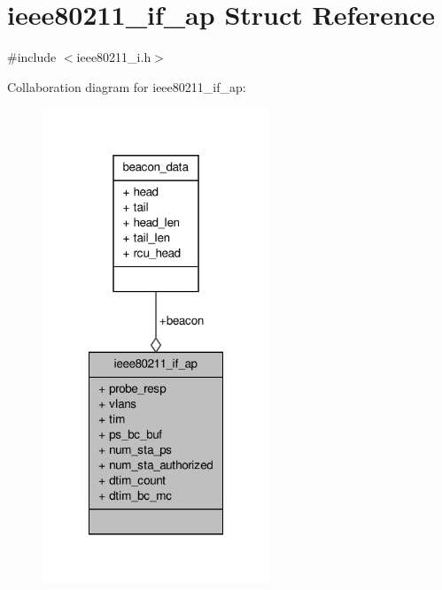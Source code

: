 \hypertarget{structieee80211__if__ap}{\section{ieee80211\-\_\-if\-\_\-ap Struct Reference}
\label{structieee80211__if__ap}
}


{\ttfamily \#include $<$ieee80211\-\_\-i.\-h$>$}



Collaboration diagram for ieee80211\-\_\-if\-\_\-ap\-:
\nopagebreak
\begin{figure}[H]
\begin{center}
\leavevmode
\includegraphics[width=192pt]{structieee80211__if__ap__coll__graph}
\end{center}
\end{figure}
